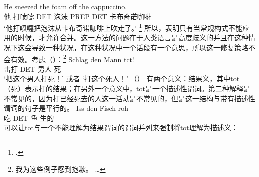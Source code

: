 \ea
\gll He sneezed the foam off the cappuccino.\\
     他 打喷嚏 DET 泡沫 PREP DET  卡布奇诺咖啡\\
\glt `他打喷嚏把泡沫从卡布奇诺咖啡上吹走了。'
\footnote{
.
}
\z
所以，\citet[--320]{SvT2011a}表明只有当常规构式不能应用的时候，才允许合并。这一方法的问题在于人类语言是高度歧义的并且在这种情况下这会导致一种状况，在这种状况中一个话段有一个意思，所以这一修复策略不会有效。考虑（）：\footnote{
  我为这些例子感到抱歉。 \ldots
}
\ea
\label{ex-schlag-den-mann-tot}
\gll Schlag den Mann tot!\\
     击打   DET 男人  死\\
\glt `把这个男人打死！' 或者 `打这个死人！'
\z
（） 有两个意义：结果义，其中tot（死）表示打的结果；在另外一个意义中，tot是一个描述性谓词。第二种解释是不常见的，因为打已经死去的人这一活动是不常见的，但是这一结构与带有描述性谓词的句子是平行的。
\ea
\gll Iss den Fisch roh!\\
     吃 DET 鱼 生的\\
\z
可以让tot与一个不能理解为结果谓词的谓词并列来强制将tot理解为描述义：
